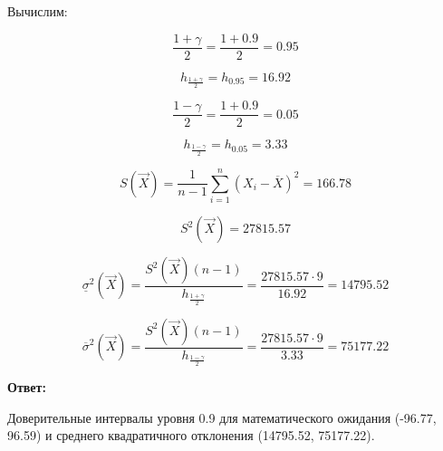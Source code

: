 Вычислим:

$$\frac{1+\gamma}{2}=\frac{1+0.9}{2}=0.95$$

$$h_{\frac{1+\gamma}{2}}=h_{0.95}=16.92$$

$$\frac{1-\gamma}{2}=\frac{1+0.9}{2}=0.05$$

$$h_{\frac{1-\gamma}{2}}=h_{0.05}=3.33$$

\begin{equation*}
S(\vec X)=\frac{1}{n-1}\sum_{i=1}^n(X_i-\overline X)^2=166.78
\end{equation*}

$$S^2(\vec X)=27815.57$$

$$\underline\sigma^2(\vec X)=\frac{S^2(\vec X)(n-1)}{h_{\frac{1+\gamma}{2}}}=
\frac{27815.57\cdot 9}{16.92}=14795.52$$

$$\overline\sigma^2(\vec X)=\frac{S^2(\vec X)(n-1)}{h_{\frac{1-\gamma}{2}}}=
\frac{27815.57\cdot 9}{3.33}=75177.22$$

\textbf{Ответ:}

Доверительные интервалы уровня 0.9 для математического ожидания (-96.77, 96.59) и среднего квадратичного отклонения (14795.52, 75177.22).


